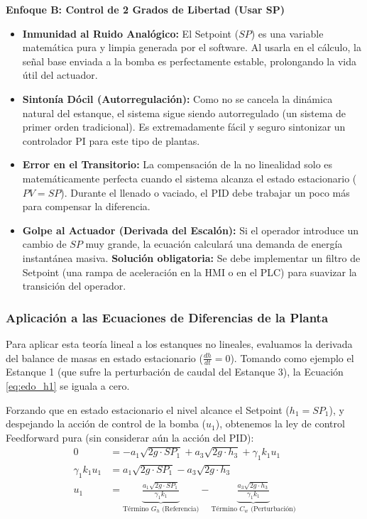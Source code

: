\vspace{3mm}
\noindent\textbf{Enfoque B: Control de 2 Grados de Libertad (Usar SP)}
\begin{itemize}
    \item[\textcolor{green!60!black}{\textbf{+}}] \textbf{Inmunidad al Ruido Analógico:} El Setpoint ($SP$) es una variable matemática pura y limpia generada por el software. Al usarla en el cálculo, la señal base enviada a la bomba es perfectamente estable, prolongando la vida útil del actuador.
    \item[\textcolor{green!60!black}{\textbf{+}}] \textbf{Sintonía Dócil (Autorregulación):} Como no se cancela la dinámica natural del estanque, el sistema sigue siendo autorregulado (un sistema de primer orden tradicional). Es extremadamente fácil y seguro sintonizar un controlador PI para este tipo de plantas.
    \item[\textcolor{red}{\textbf{--}}] \textbf{Error en el Transitorio:} La compensación de la no linealidad solo es matemáticamente perfecta cuando el sistema alcanza el estado estacionario ($PV = SP$). Durante el llenado o vaciado, el PID debe trabajar un poco más para compensar la diferencia.
    \item[\textcolor{red}{\textbf{--}}] \textbf{Golpe al Actuador (Derivada del Escalón):} Si el operador introduce un cambio de $SP$ muy grande, la ecuación calculará una demanda de energía instantánea masiva. \textbf{Solución obligatoria:} Se debe implementar un filtro de Setpoint (una rampa de aceleración en la HMI o en el PLC) para suavizar la transición del operador.
\end{itemize}

\subsubsection{Aplicación a las Ecuaciones de Diferencias de la Planta}
Para aplicar esta teoría lineal a los estanques no lineales, evaluamos la derivada del balance de masas en estado estacionario ($\frac{dh}{dt} = 0$). Tomando como ejemplo el Estanque 1 (que sufre la perturbación de caudal del Estanque 3), la Ecuación \ref{eq:edo_h1} se iguala a cero.

Forzando que en estado estacionario el nivel alcance el Setpoint ($h_1 = SP_1$), y despejando la acción de control de la bomba ($u_1$), obtenemos la ley de control Feedforward pura (sin considerar aún la acción del PID):
\begin{align}
    0 &= -a_1 \sqrt{2g \cdot SP_1} + a_3 \sqrt{2g \cdot h_3} + \gamma_1 k_1 u_1 \nonumber \\
    \gamma_1 k_1 u_1 &= a_1 \sqrt{2g \cdot SP_1} - a_3 \sqrt{2g \cdot h_3} \nonumber \\
    u_1 &= \underbrace{\frac{a_1 \sqrt{2g \cdot SP_1}}{\gamma_1 k_1}}_{\text{Término } G_h \text{ (Referencia)}} - \underbrace{\frac{a_3 \sqrt{2g \cdot h_3}}{\gamma_1 k_1}}_{\text{Término } C_w \text{ (Perturbación)}}
\end{align}

